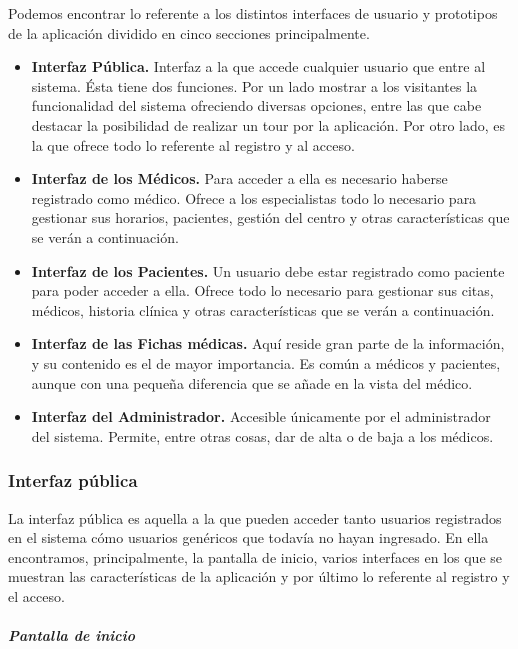 \documentclass[a4paper,oneside,11pt]{book}
\begin{document}
	Podemos encontrar lo referente a los distintos interfaces de usuario y prototipos de la aplicación dividido en cinco secciones principalmente.
	\begin{itemize}
	\item \textbf{Interfaz Pública.} Interfaz a la que accede cualquier usuario que entre al sistema. Ésta tiene dos funciones. Por un lado mostrar a los visitantes la funcionalidad del sistema ofreciendo diversas opciones, entre las que cabe destacar la posibilidad de realizar un tour por la aplicación. Por otro lado, es la que ofrece todo lo referente al registro y al acceso.
	\item \textbf{Interfaz de los Médicos.} Para acceder a ella es necesario haberse registrado como médico. Ofrece a los especialistas todo lo necesario para gestionar sus horarios, pacientes, gestión del centro y otras características que se verán a continuación.
	\item \textbf{Interfaz de los Pacientes.} Un usuario debe estar registrado como paciente para poder acceder a ella. Ofrece todo lo necesario para gestionar sus citas, médicos, historia clínica y otras características que se verán a continuación.
	\item \textbf{Interfaz de las Fichas médicas.} Aquí reside gran parte de la información, y su contenido es el de mayor importancia. Es común a médicos y pacientes, aunque con una pequeña diferencia que se añade en la vista del médico.
	\item \textbf{Interfaz del Administrador.} Accesible únicamente por el administrador del sistema. Permite, entre otras cosas, dar de alta o de baja a los médicos.
	\end{itemize}
	
	\subsubsection{Interfaz pública} %
		\label{sub:iu_interfaz_publica}
		
		La interfaz pública es aquella a la que pueden acceder tanto usuarios registrados en el sistema cómo usuarios genéricos que todavía no hayan ingresado. En ella encontramos, principalmente, la pantalla de inicio, varios interfaces en los que se muestran las características de la aplicación y por último lo referente al registro y el acceso.
		
		\subparagraph{Pantalla de inicio} %
		\label{par:iu_pantalla_de_inicio}
		
\end{document}
